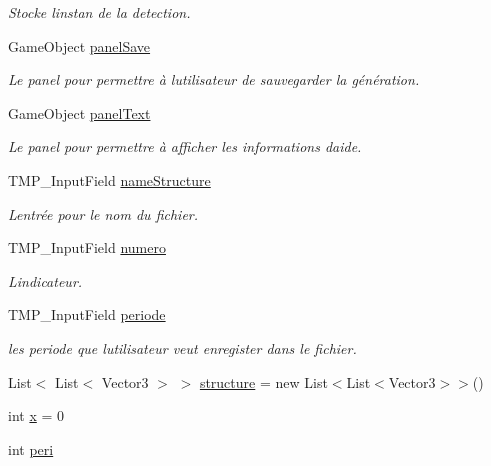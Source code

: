 \begin{DoxyCompactItemize}
\begin{DoxyCompactList}\small\item\em Stocke l\textquotesingle{}instan de la detection. \end{DoxyCompactList}\item 
Game\+Object \mbox{\hyperlink{class_simulation_a278d42069f2672d880c171af84a4b1b1}{panel\+Save}}
\begin{DoxyCompactList}\small\item\em Le panel pour permettre à l\textquotesingle{}utilisateur de sauvegarder la génération. \end{DoxyCompactList}\item 
Game\+Object \mbox{\hyperlink{class_simulation_a51f753f5907cb4985c5b802c34fb68c1}{panel\+Text}}
\begin{DoxyCompactList}\small\item\em Le panel pour permettre à afficher les informations d\textquotesingle{}aide. \end{DoxyCompactList}\item 
T\+M\+P\+\_\+\+Input\+Field \mbox{\hyperlink{class_simulation_acaaccf034e750d037d15e5b26cd881b8}{name\+Structure}}
\begin{DoxyCompactList}\small\item\em L\textquotesingle{}entrée pour le nom du fichier. \end{DoxyCompactList}\item 
T\+M\+P\+\_\+\+Input\+Field \mbox{\hyperlink{class_simulation_aa43a91e87c7c650fc7d67a1d845ada89}{numero}}
\begin{DoxyCompactList}\small\item\em L\textquotesingle{}indicateur. \end{DoxyCompactList}\item 
T\+M\+P\+\_\+\+Input\+Field \mbox{\hyperlink{class_simulation_aee455a3c4114262af0c5242aa26ea779}{periode}}
\begin{DoxyCompactList}\small\item\em les periode que l\textquotesingle{}utilisateur veut enregister dans le fichier. \end{DoxyCompactList}\item 
List$<$ List$<$ Vector3 $>$ $>$ \mbox{\hyperlink{class_simulation_a0408a0584ec3cc3a9cc2ef1860fd652f}{structure}} = new List$<$List$<$Vector3$>$$>$()
\item 
int \mbox{\hyperlink{class_simulation_a4bdb9d5d8e21dd532d9683383691a70b}{x}} = 0
\item 
int \mbox{\hyperlink{class_simulation_a214fc9916eb818cadeb37dfba3d14f23}{peri}}
\end{DoxyCompactItemize}


